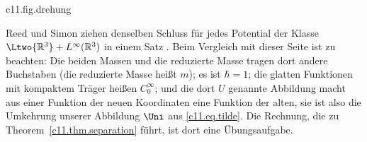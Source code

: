 \begin{fundament}
  \begin{tpcfigure}{c11.fig.drehung}
    \caption{Schritt 2 des Beweises für eine Raumrichtung, gezeichnet für $\massP : \massE = 3 : 1$. In der Ebene der skalierten Koordinaten $x_{\mathrm{e}}$, $x_{\mathrm{p}}$ ist $z$ die Koordinate längs des Einheitsvektors mit den Komponenten $\sqrt{\massP/\massTot}$ und $-\sqrt{\massE/\massTot}$. Dieser und die dazu senkrechte Richtung bilden ein gedrehtes Achsenkreuz; der Kreis ist der Einheitskreis.}
  \end{tpcfigure}

  Reed und Simon ziehen denselben Schluss für jedes Potential der Klasse
  $\Ltwo{\mathbb{R}^3} + L^{\infty}(\mathbb{R}^3)$ in einem Satz
  . Beim Vergleich mit dieser Seite ist zu beachten:
  Die beiden Massen und die reduzierte Masse tragen dort andere Buchstaben (die
  reduzierte Masse heißt $m$); es ist $\hbar = 1$; die glatten Funktionen mit kompaktem
  Träger heißen $C_0^{\infty}$; und die dort $U$ genannte Abbildung macht aus einer
  Funktion der neuen Koordinaten eine Funktion der alten, sie ist also die Umkehrung
  unserer Abbildung $\Uni$ aus \eqref{c11.eq.tilde}. Die Rechnung, die zu
  Theorem~\ref{c11.thm.separation} führt, ist dort eine Übungsaufgabe.
\end{fundament}
